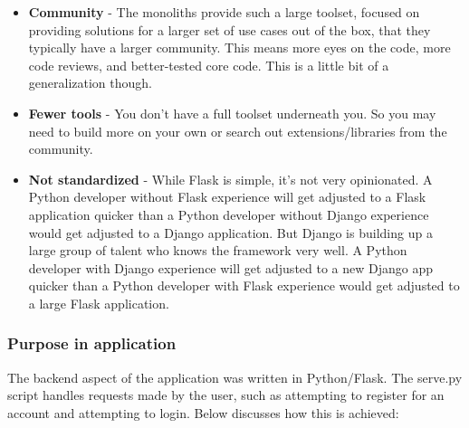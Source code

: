 \begin{itemize}
    \item \textbf{Community} - The monoliths provide such a large toolset,
    focused on providing solutions for a larger set of use cases out of the box,
    that they typically have a larger community. This means more eyes on the
    code, more code reviews, and better-tested core code. This is a little bit
    of a generalization though.
    \item \textbf{Fewer tools} -  You don’t have a full toolset underneath you.
    So you may need to build more on your own or search out extensions/libraries
    from the community.
    \item \textbf{Not standardized} - While Flask is simple, it’s
    not very opinionated. A Python developer without Flask experience will get 
    adjusted to a Flask application quicker than a Python developer without 
    Django experience would get adjusted to a Django application. But Django is 
    building up a large group of talent who knows the framework very well. A 
    Python developer with Django experience will get adjusted to a new Django 
    app quicker than a Python developer with Flask experience would get adjusted
    to a large Flask application.
\end{itemize}

\newpage
\subsubsection{Purpose in application}
The backend aspect of the application was written in Python/Flask. The serve.py script handles requests made by the user, such as attempting to register for an account and attempting to login. Below discusses how this is achieved:

